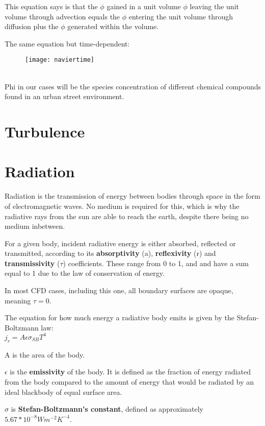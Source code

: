 This equation says is that the $\phi$ gained in a unit volume $\phi$ leaving the unit volume through advection equals the $\phi$ entering the unit volume through diffusion plus the $\phi$ generated within the volume.

The same equation but time-dependent:
\\
\begin{figure}[h]
\texttt{[image: naviertime]}
\end{figure}
\\

Phi in our cases will be the species concentration of different chemical compounds found in an urban street environment.

\section{Turbulence}

\section{Radiation}

Radiation is the transmission of energy between bodies through space in the form of electromagnetic waves. No medium is required for this, which is why the radiative rays from the sun are able to reach the earth, despite there being no medium inbetween.

For a given body, incident radiative energy is either absorbed, reflected or transmitted, according to its \textbf{absorptivity} (a), \textbf{reflexivity} (r) and \textbf{transmissivity} ($\tau$) coefficients. These range from 0 to 1, and and have a sum equal to 1 due to the law of conservation of energy.

In most CFD cases, including this one, all boundary surfaces are opaque, meaning $\tau = 0$.

The equation for how much energy a radiative body emits is given by the Stefan-Boltzmann law:
\\
$j_r = A\epsilon \sigma_{SB}T^4$

A is the area of the body.

$\epsilon$ is the \textbf{emissivity} of the body. It is defined as the fraction of energy radiated from the body compared to the amount of energy that would be radiated by an ideal blackbody of equal surface area.

$\sigma$ is \textbf{Stefan-Boltzmann's constant}, defined as approximately $5.67*10^{-8}Wm^{-2}K^{-4}$.

